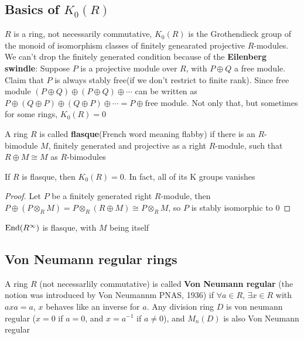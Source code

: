 \documentclass[main]{subfiles}
\begin{document}
\subsection{Basics of $K_0(R)$}

$R$ is a ring, not necessarily commutative, $K_0(R)$ is the Grothendieck group of the monoid of isomorphism classes of finitely genearated projective $R$-modules. We can't drop the finitely generated condition because of the \textbf{Eilenberg swindle}: Suppose $P$ is a projective module over $R$, with $P\oplus Q$ a free module. Claim that $P$ is always stably free(if we don't restrict to finite rank). Since free module $(P\oplus Q)\oplus (P\oplus Q)\oplus\cdots$ can be written as $P\oplus (Q\oplus P)\oplus (Q\oplus P)\oplus\cdots=P\oplus\text{free module}$. Not only that, but sometimes for some rings, $K_0(R)=0$

\begin{definition}[Karoubi]
A ring $R$ is called \textbf{flasque}(French word meaning flabby) if there is an $R$-bimodule $M$, finitely generated and projective as a right $R$-module, such that $R\oplus M\cong M$ as $R$-bimodules
\end{definition}

\begin{proposition}[Karoubi]
If $R$ is flasque, then $K_0(R)=0$. In fact, all of its K groups vanishes
\end{proposition}

\begin{proof}
Let $P$ be a finitely generated right $R$-module, then $P\oplus(P\otimes _RM)=P\otimes_R(R\oplus M)\cong P\otimes_RM$, so $P$ is stably isomorphic to 0
\end{proof}

\begin{example}
$\operatorname{End}(R^\infty)$ is flasque, with $M$ being itself
\end{example}

\subsection{Von Neumann regular rings}

A ring $R$ (not necessarlily commutative) is called \textbf{Von Neumann regular} (the notion was introduced by Von Neumannm PNAS, 1936) if $\forall a\in R$, $\exists x\in R$ with $axa=a$, $x$ behaves like an inverse for $a$. Any division ring $D$ is von neumann regular ($x=0$ if $a=0$, and $x=a^{-1}$ if $a\neq0$), and $M_n(D)$ is also Von Neumann regular
\end{document}
